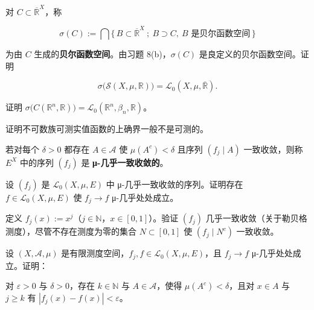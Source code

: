 \begin{exercises}
\begin{items}
\end{items}

\item

对 $ C \subset \overline{\mathbb{R}}^{X} $，称

\[
\sigma(C) := \bigcap \{\, B \subset \overline{\mathbb{R}}^{X} \ ;\ B \supset C,\ B \text{ 是贝尔函数空间} \,\}
\]

为由 $ C $ 生成的\textbf{贝尔函数空间}。由习题 8(b)，$ \sigma(C) $ 是良定义的贝尔函数空间。证明

\[
\sigma\big(\mathcal{S}(X,\mu,\mathbb{R})\big) = \mathcal{L}_0(X,\mu,\overline{\mathbb{R}}) .
\]
\item

证明 $ \sigma\big(C(\mathbb{R}^{n},\mathbb{R})\big) = \mathcal{L}_0(\mathbb{R}^{n},\beta_n,\mathbb{R}) $。

\item

证明不可数族可测实值函数的上确界一般不是可测的。

\item

若对每个 $ \delta>0 $ 都存在 $ A \in \mathcal{A} $ 使 $ \mu(A^{c})<\delta $ 且序列 $ (f_j \mid A) $ 一致收敛，则称 $ E^{X} $ 中的序列 $ (f_j) $ 是 \textbf{μ-几乎一致收敛的}。

\begin{items}
\item

设 $ (f_j) $ 是 $ \mathcal{L}_0(X,\mu,E) $ 中 μ-几乎一致收敛的序列。证明存在 $ f \in \mathcal{L}_0(X,\mu,E) $ 使 $ f_j \to f $ μ-几乎处处成立。

\item

定义 $ f_j(x) := x^{j} $（$ j \in \mathbb{N} $，$ x \in [0,1] $）。验证 $ (f_j) $ 几乎一致收敛（关于勒贝格测度），尽管不存在测度为零的集合 $ N \subset [0,1] $ 使 $ (f_j \mid N^{c}) $ 一致收敛。

\end{items}

\item

设 $ (X,\mathcal{A},\mu) $ 是有限测度空间，$ f_j, f \in \mathcal{L}_0(X,\mu,E) $，且 $ f_j \to f $ μ-几乎处处成立。证明：

\begin{items}
\item

对 $ \varepsilon>0 $ 与 $ \delta>0 $，存在 $ k \in \mathbb{N} $ 与 $ A \in \mathcal{A} $，使得 $ \mu(A^{c})<\delta $，且对 $ x \in A $ 与 $ j \ge k $ 有 $ |f_j(x)-f(x)|<\varepsilon $。


\end{items}
\end{exercises}
